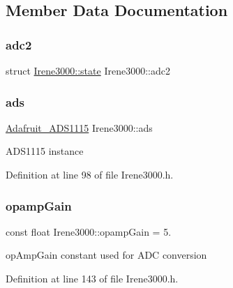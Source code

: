 \subsection{Member Data Documentation}
\mbox{\label{class_irene3000_aae3a95a1c83c766cd2f299ce471c337e}} 
\subsubsection{\texorpdfstring{adc2}{adc2}}
{\footnotesize\ttfamily struct \hyperlink{struct_irene3000_1_1state}{Irene3000\+::state} Irene3000\+::adc2\hspace{0.3cm}{\ttfamily [private]}}

\mbox{\label{class_irene3000_a1215e77ba761c9908d80d691f149e135}} 
\subsubsection{\texorpdfstring{ads}{ads}}
{\footnotesize\ttfamily \hyperlink{class_adafruit___a_d_s1115}{Adafruit\+\_\+\+A\+D\+S1115} Irene3000\+::ads\hspace{0.3cm}{\ttfamily [private]}}

A\+D\+S1115 instance 

Definition at line 98 of file Irene3000.\+h.

\mbox{\label{class_irene3000_a4e588985ca74e5076029d5dee81034f2}} 
\subsubsection{\texorpdfstring{opamp\+Gain}{opampGain}}
{\footnotesize\ttfamily const float Irene3000\+::opamp\+Gain = 5.\hspace{0.3cm}{\ttfamily [private]}}

op\+Amp\+Gain constant used for A\+DC conversion 

Definition at line 143 of file Irene3000.\+h.

\mbox{\label{class_irene3000_a136585a5ee7f9ac6ab52175fa153f8e3}} 
